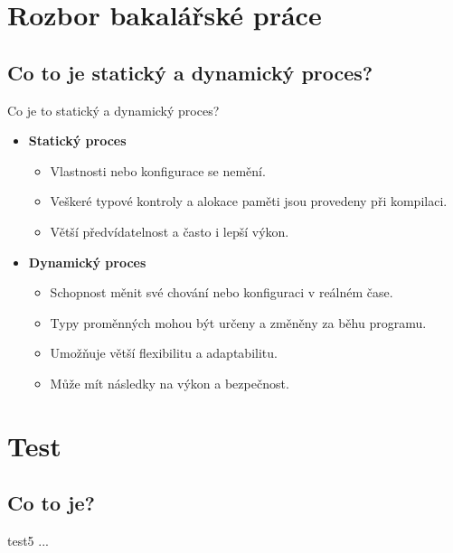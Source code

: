 \documentclass{beamer}
\begin{document}
\section{Rozbor bakalářské práce}
\subsection{Co to je statický a dynamický proces?}
\begin{frame}{Co je to statický a dynamický proces?}
	\begin{itemize}
		\item \textbf{Statický proces}
			\begin{itemize}
				\item[\textendash] Vlastnosti nebo konfigurace se nemění.
				\item[\textendash] Veškeré typové kontroly a alokace paměti jsou provedeny při kompilaci.
				\item[\textendash] Větší předvídatelnost a často i lepší výkon.
			\end{itemize}
		\item \textbf{Dynamický proces}
			\begin{itemize}
				\item[\textendash] Schopnost měnit své chování nebo konfiguraci v reálném čase.
				\item[\textendash] Typy proměnných mohou být určeny a změněny za běhu programu.
				\item[\textendash] Umožňuje větší flexibilitu a adaptabilitu.
				\item[\textendash] Může mít následky na výkon a bezpečnost.
			\end{itemize}
	\end{itemize}

\end{frame}

\section{Test}
\subsection{Co to je?}
\begin{frame}{test5}
...
\end{frame}
\end{document}
